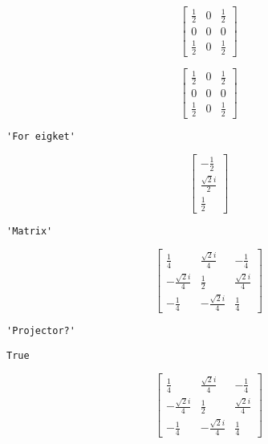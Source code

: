 \documentclass[11pt]{article}
\begin{document}
    
    $$\left[\begin{matrix}\frac{1}{2} & 0 & \frac{1}{2}\\0 & 0 & 0\\\frac{1}{2} & 0 & \frac{1}{2}\end{matrix}\right]$$

    
    $$\left[\begin{matrix}\frac{1}{2} & 0 & \frac{1}{2}\\0 & 0 & 0\\\frac{1}{2} & 0 & \frac{1}{2}\end{matrix}\right]$$

    
    
    \begin{verbatim}
'For eigket'
    \end{verbatim}

    
    $$\left[\begin{matrix}- \frac{1}{2}\\\frac{\sqrt{2} i}{2}\\\frac{1}{2}\end{matrix}\right]$$

    
    
    \begin{verbatim}
'Matrix'
    \end{verbatim}

    
    $$\left[\begin{matrix}\frac{1}{4} & \frac{\sqrt{2} i}{4} & - \frac{1}{4}\\- \frac{\sqrt{2} i}{4} & \frac{1}{2} & \frac{\sqrt{2} i}{4}\\- \frac{1}{4} & - \frac{\sqrt{2} i}{4} & \frac{1}{4}\end{matrix}\right]$$

    
    
    \begin{verbatim}
'Projector?'
    \end{verbatim}

    
    
    \begin{verbatim}
True
    \end{verbatim}

    
    $$\left[\begin{matrix}\frac{1}{4} & \frac{\sqrt{2} i}{4} & - \frac{1}{4}\\- \frac{\sqrt{2} i}{4} & \frac{1}{2} & \frac{\sqrt{2} i}{4}\\- \frac{1}{4} & - \frac{\sqrt{2} i}{4} & \frac{1}{4}\end{matrix}\right]$$
\end{document}
